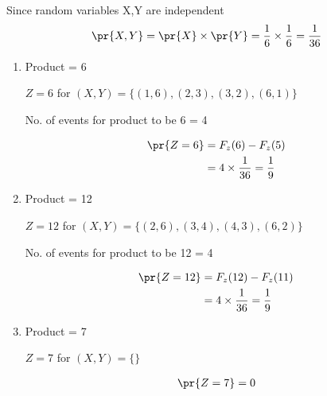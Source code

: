 \documentclass[journal,12pt,twocolumn]{IEEEtran}
\begin{document}
Since random variables X,Y are independent 
\begin{align}
\pr{X,Y}=\pr{X} \times \pr{Y}=\frac{1}{6} \times \frac{1}{6}=\frac{1}{36}
\end{align}

\begin{enumerate}
\item Product = 6

$Z=6$ for $(X,Y) = \{(1,6) , (2,3) , (3,2), (6,1)\}$

No. of events for product to be 6 = 4 

\begin{align}
\pr{Z=6}&= F_z(6)-F_z(5)\\
&= 4 \times \frac{1}{36}=\frac{1}{9} 
\end{align}

\item Product = 12

$Z=12$ for $(X,Y) = \{(2,6) , (3,4) , (4,3), (6,2)\}$

No. of events for product to be 12 = 4 

\begin{align}
\pr{Z=12}&= F_z(12)-F_z(11)\\
&= 4 \times \frac{1}{36}=\frac{1}{9} 
\end{align}
\item Product = 7

$Z=7$ for $(X,Y) = \{\}$

\begin{align}
\pr{Z=7} = 0
\end{align}

\end{enumerate}
\end{document}

